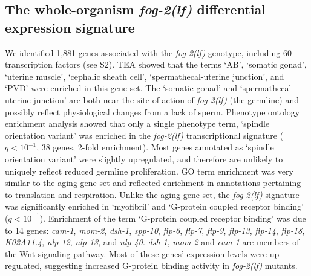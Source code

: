 \documentclass[9pt,twocolumn,twoside]{gsag3jnl}
\newcommand{\fog}{\emph{\mbox{fog-2(lf)}}}
\newcommand{\gene}[1]{\emph{\mbox{#1}}}
\newcommand{\fogn}{1,881}
\newcommand{\tffog}{60}
\begin{document}
\subsection*{The whole-organism \fog{} differential expression signature}
We identified \fogn{} genes associated with the \fog{} genotype, including
\tffog{} transcription factors (see S2). TEA showed that the terms `AB',
`somatic gonad', `uterine muscle', `cephalic sheath cell', `spermathecal-uterine
junction', and `PVD' were enriched in this gene set. The `somatic gonad' and
`spermathecal-uterine junction' are both near the site of action of \fog{} (the
germline) and possibly reflect physiological changes from a lack of sperm.
Phenotype ontology enrichment analysis showed that only a single phenotype term,
`spindle orientation variant' was enriched in the \fog{} transcriptional
signature ($q<10^{-1}$, 38 genes, 2-fold enrichment). Most genes annotated as
`spindle orientation variant' were slightly upregulated, and therefore are
unlikely to uniquely reflect reduced germline proliferation. GO term enrichment
was very similar to the aging gene set and reflected enrichment in annotations
pertaining to translation and respiration. Unlike the aging gene set, the \fog{}
signature was significantly enriched in `myofibril' and `G-protein coupled
receptor binding' ($q<10^{-1}$). Enrichment of the term `G-protein coupled
receptor binding' was due to 14 genes: \gene{cam-1}, \gene{mom-2},
\gene{dsh-1}, \gene{spp-10}, \gene{flp-6}, \gene{flp-7}, \gene{flp-9},
\gene{flp-13}, \gene{flp-14}, \gene{flp-18}, \gene{K02A11.4}, \gene{nlp-12},
\gene{nlp-13}, and \gene{nlp-40}. \gene{dsh-1}, \gene{mom-2} and \gene{cam-1}
are members of the Wnt signaling pathway. Most of these genes' expression levels
were up-regulated, suggesting increased G-protein binding activity in \fog{}
mutants.
\end{document}

